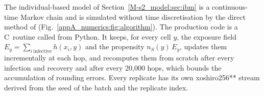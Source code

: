 The individual-based model of Section~\ref{M-s2_model:sec:ibm} is a continuous-time Markov chain and is
simulated without time discretisation by the direct method of \citet{gillespie1976general,gillespie1977exact}
(Fig.~\ref{appA_numerics:fig:algorithm}). The production code is a C~routine called from Python. It keeps,
for every cell $y$, the exposure field $E_y=\sum_{i\ \mathrm{infective}}h(x_i,y)$ and the propensity
$n_S(y)\,E_y$, updates them incrementally at each hop, and recomputes them from scratch after every infection
and recovery and after every 20{,}000 hops, which bounds the accumulation of rounding errors. Every replicate
has its own xoshiro256** stream \citep{blackman2021scrambled} derived from the seed of the batch and the
replicate index.

